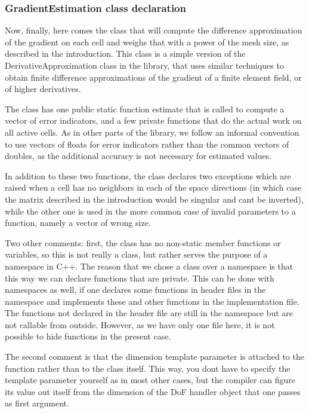 \label{_GradientEstimationclassdeclaration}%
 \subsubsection*{Gradient\+Estimation class declaration}

Now, finally, here comes the class that will compute the difference approximation of the gradient on each cell and weighs that with a power of the mesh size, as described in the introduction. This class is a simple version of the {\ttfamily Derivative\+Approximation} class in the library, that uses similar techniques to obtain finite difference approximations of the gradient of a finite element field, or of higher derivatives.

The class has one public static function {\ttfamily estimate} that is called to compute a vector of error indicators, and a few private functions that do the actual work on all active cells. As in other parts of the library, we follow an informal convention to use vectors of floats for error indicators rather than the common vectors of doubles, as the additional accuracy is not necessary for estimated values.

In addition to these two functions, the class declares two exceptions which are raised when a cell has no neighbors in each of the space directions (in which case the matrix described in the introduction would be singular and can\textquotesingle{}t be inverted), while the other one is used in the more common case of invalid parameters to a function, namely a vector of wrong size.

Two other comments\+: first, the class has no non-\/static member functions or variables, so this is not really a class, but rather serves the purpose of a {\ttfamily namespace} in C++. The reason that we chose a class over a namespace is that this way we can declare functions that are private. This can be done with namespaces as well, if one declares some functions in header files in the namespace and implements these and other functions in the implementation file. The functions not declared in the header file are still in the namespace but are not callable from outside. However, as we have only one file here, it is not possible to hide functions in the present case.

The second comment is that the dimension template parameter is attached to the function rather than to the class itself. This way, you don\textquotesingle{}t have to specify the template parameter yourself as in most other cases, but the compiler can figure its value out itself from the dimension of the DoF handler object that one passes as first argument.

